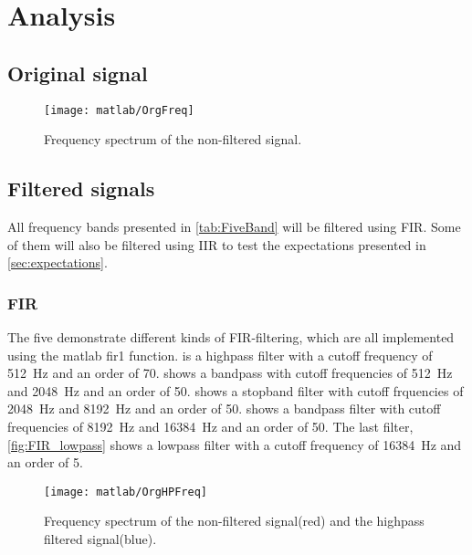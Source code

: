 
\section{Analysis}

\subsection{Original signal}

\begin{figure}[!htb]
	\centering
	\texttt{[image: matlab/OrgFreq]}
	\caption{Frequency spectrum of the non-filtered signal.}
	\label{fig:orgfreq}
\end{figure}

\subsection{Filtered signals}
All frequency bands presented in \cref{tab:FiveBand} will be filtered using FIR. Some of them will also be filtered using IIR to test the expectations presented in \cref{sec:expectations}.

\subsubsection{FIR}
The five  demonstrate different kinds of FIR-filtering, which are all implemented using the matlab fir1 function.  is a highpass filter with a cutoff frequency of \SI{512}{\hertz} and an order of 70.  shows a bandpass with cutoff frequencies of \SI{512}{\hertz} and \SI{2048}{\hertz} and an order of 50.  shows a stopband filter with cutoff frquencies of \SI{2048}{\hertz} and \SI{8192}{\hertz} and an order of 50.  shows a bandpass filter with cutoff frequencies of \SI{8192}{\hertz} and \SI{16384}{\hertz} and an order of 50. The last filter, \cref{fig:FIR_lowpass} shows a lowpass filter with a cutoff frequency of \SI{16384}{\hertz} and an order of 5.

\begin{figure}[!htb]
	\centering
	\texttt{[image: matlab/OrgHPFreq]}
	\caption{Frequency spectrum of the non-filtered signal(red) and the highpass filtered signal(blue).}
	\label{fig:FIR_hipass}
\end{figure}

